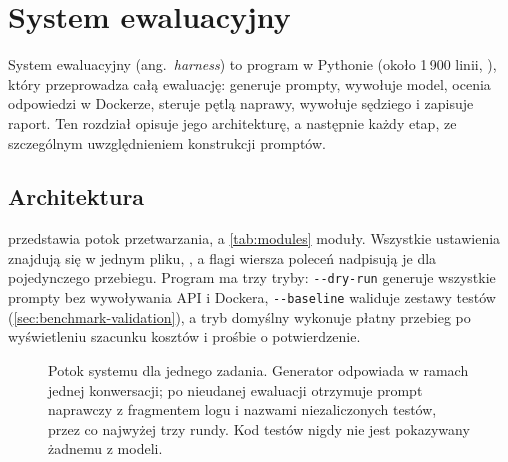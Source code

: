 \chapter{System ewaluacyjny}
\label{ch:harness}

System ewaluacyjny (ang.~\emph{harness}) to program w Pythonie (około 1\,900 linii, ),
który przeprowadza całą ewaluację: generuje prompty, wywołuje model, ocenia odpowiedzi w Dockerze,
steruje pętlą naprawy, wywołuje sędziego i zapisuje raport. Ten rozdział opisuje jego architekturę,
a następnie każdy etap, ze szczególnym uwzględnieniem konstrukcji promptów.

\section{Architektura}
\label{sec:architecture}

 przedstawia potok przetwarzania, a \cref{tab:modules} moduły. Wszystkie
ustawienia znajdują się w jednym pliku, , a flagi wiersza poleceń nadpisują je dla
pojedynczego przebiegu. Program ma trzy tryby: \texttt{-{}-dry-run} generuje wszystkie prompty bez
wywoływania API i Dockera, \texttt{-{}-baseline} waliduje zestawy testów
(\cref{sec:benchmark-validation}), a tryb domyślny wykonuje płatny przebieg po wyświetleniu
szacunku kosztów i prośbie o potwierdzenie.

\begin{figure}[htbp]
  \centering
  
  \caption{Potok systemu dla jednego zadania. Generator odpowiada w ramach jednej konwersacji; po
    nieudanej ewaluacji otrzymuje prompt naprawczy z fragmentem logu i nazwami niezaliczonych
    testów, przez co najwyżej trzy rundy. Kod testów nigdy nie jest pokazywany żadnemu z modeli.}
  \label{fig:pipeline}
\end{figure}

